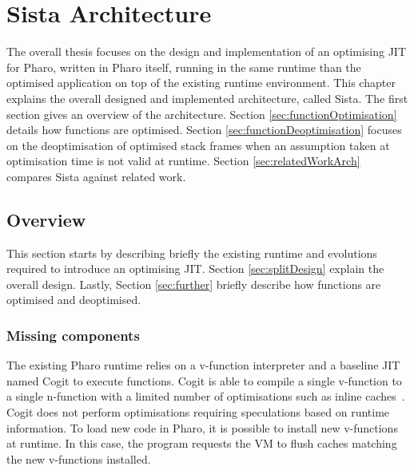 \documentclass[a4paper,12pt,twoside]{../includes/ThesisStyle}
\begin{document}
\fi

\chapter{Sista Architecture}
\label{chap:architecture}
\minitoc

The overall thesis focuses on the design and implementation of an optimising JIT for Pharo, written in Pharo itself, running in the same runtime than the optimised application on top of the existing runtime environment. This chapter explains the overall designed and implemented architecture, called Sista. The first section gives an overview of the architecture. Section \ref{sec:functionOptimisation} details how functions are optimised. Section \ref{sec:functionDeoptimisation} focuses on the deoptimisation of optimised stack frames when an assumption taken at optimisation time is not valid at runtime. Section \ref{sec:relatedWorkArch} compares Sista against related work.


\section{Overview}

This section starts by describing briefly the existing runtime and evolutions required to introduce an optimising JIT. Section \ref{sec:splitDesign} explain the overall design. Lastly, Section \ref{sec:further} briefly describe how functions are optimised and deoptimised. 

\subsection{Missing components}

The existing Pharo runtime relies on a v-function interpreter and a baseline JIT named Cogit to execute functions. Cogit is able to compile a single v-function to a single n-function with a limited number of optimisations such as inline caches~\cite{Deut84a,Holz91a}. Cogit does not perform optimisations requiring speculations based on runtime information. To load new code in Pharo, it is possible to install new v-functions at runtime. In this case, the program requests the VM to flush caches matching the new v-functions installed.
\end{document}
